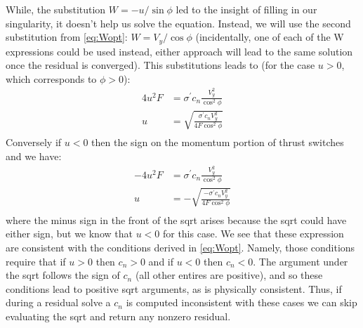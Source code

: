 \documentclass{article}
\begin{document}
While, the substitution $W = -u/\sin\phi$ led to the insight of filling in our singularity, it doesn't help us solve the equation.  Instead, we will use the second substitution from \cref{eq:Wopt}: $W = V_y / \cos\phi$ (incidentally, one of each of the W expressions could be used instead, either approach will lead to the same solution once the residual is converged).  This substitutions leads to (for the case $u > 0$, which corresponds to $\phi > 0$):
\begin{equation}
\begin{aligned}
4 u^2 F&= \sigma^\prime c_n \frac{V_y^2}{\cos^2\phi}\\
u&= \sqrt{\frac{\sigma^\prime c_n V_y^2}{4 F \cos^2\phi}}\\
\end{aligned}
\end{equation}
Conversely if $u < 0$ then the sign on the momentum portion of thrust switches and we have:
\begin{equation}
\begin{aligned}
- 4 u^2 F&= \sigma^\prime c_n \frac{V_y^2}{\cos^2\phi}\\
u&= -\sqrt{\frac{-\sigma^\prime c_n V_y^2}{4 F \cos^2\phi}}\\
\end{aligned}
\end{equation}
where the minus sign in the front of the sqrt arises because the sqrt could have either sign, but we know that $u < 0$ for this case.  We see that these expression are consistent with the conditions derived in \cref{eq:Wopt}.  Namely, those conditions require that if $u > 0$ then $c_n > 0$ and if $u < 0$ then $c_n < 0$.  The argument under the sqrt follows the sign of $c_n$ (all other entires are positive), and so these conditions lead to positive sqrt arguments, as is physically consistent.  Thus, if during a residual solve a $c_n$ is computed inconsistent with these cases we can skip evaluating the sqrt and return any nonzero residual.

\end{document}

